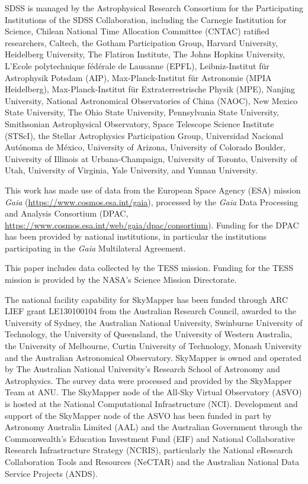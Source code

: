 \documentclass{natureprintstyle}
\begin{document}
\begin{addendum}
SDSS is managed by the Astrophysical Research Consortium for the Participating Institutions of the SDSS Collaboration, including the Carnegie Institution for Science, Chilean National Time Allocation Committee (CNTAC) ratified researchers, Caltech, the Gotham Participation Group, Harvard University, Heidelberg University, The Flatiron Institute, The Johns Hopkins University, L'Ecole polytechnique f\'{e}d\'{e}rale de Lausanne (EPFL), Leibniz-Institut f\"{u}r Astrophysik Potsdam (AIP), Max-Planck-Institut f\"{u}r Astronomie (MPIA Heidelberg), Max-Planck-Institut f\"{u}r Extraterrestrische Physik (MPE), Nanjing University, National Astronomical Observatories of China (NAOC), New Mexico State University, The Ohio State University, Pennsylvania State University, Smithsonian Astrophysical Observatory, Space Telescope Science Institute (STScI), the Stellar Astrophysics Participation Group, Universidad Nacional Aut\'{o}noma de M\'{e}xico, University of Arizona, University of Colorado Boulder, University of Illinois at Urbana-Champaign, University of Toronto, University of Utah, University of Virginia, Yale University, and Yunnan University.

This work has made use of data from the European Space Agency (ESA) mission
{\it Gaia} (\url{https://www.cosmos.esa.int/gaia}), processed by the {\it Gaia}
Data Processing and Analysis Consortium (DPAC,
\url{https://www.cosmos.esa.int/web/gaia/dpac/consortium}). Funding for the DPAC
has been provided by national institutions, in particular the institutions
participating in the {\it Gaia} Multilateral Agreement.

This paper includes data collected by the TESS mission. Funding for the TESS mission is provided by the NASA's Science Mission Directorate.

The national facility capability for SkyMapper has been funded through ARC
LIEF grant LE130100104 from the Australian Research Council, awarded to
the University of Sydney, the Australian National University, Swinburne
University of Technology, the University of Queensland, the University
of Western Australia, the University of Melbourne, Curtin University of
Technology, Monash University and the Australian Astronomical Observatory.
SkyMapper is owned and operated by The Australian National University's
Research School of Astronomy and Astrophysics.  The survey data were
processed and provided by the SkyMapper Team at ANU.  The SkyMapper node
of the All-Sky Virtual Observatory (ASVO) is hosted at the National
Computational Infrastructure (NCI).  Development and support of the
SkyMapper node of the ASVO has been funded in part by Astronomy Australia
Limited (AAL) and the Australian Government through the Commonwealth's
Education Investment Fund (EIF) and National Collaborative Research
Infrastructure Strategy (NCRIS), particularly the National eResearch
Collaboration Tools and Resources (NeCTAR) and the Australian National
Data Service Projects (ANDS).


\end{addendum}
\end{document}

